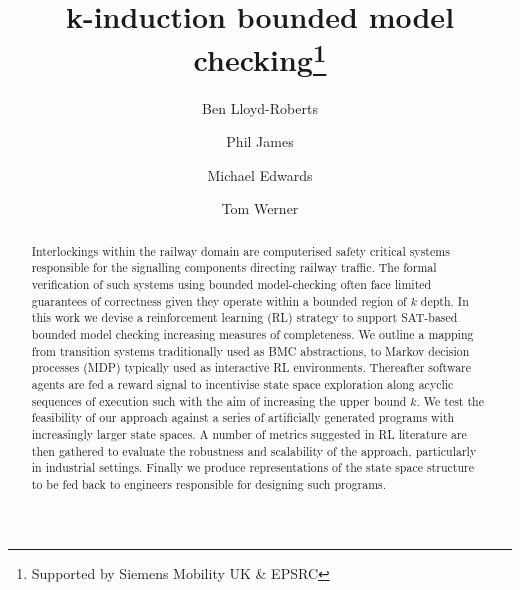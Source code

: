 \documentclass[runningheads]{llncs}
\begin{document}
%
\title{k-induction bounded model checking\thanks{Supported by Siemens Mobility UK \& EPSRC}}
%
%
\author{Ben Lloyd-Roberts \and
Phil James \and
Michael Edwards \and 
Tom Werner}
%
%


%
\maketitle              %
%
\begin{abstract}
Interlockings within the railway domain are computerised safety critical systems responsible for the signalling components directing railway traffic. The formal verification of such systems using bounded model-checking often face limited guarantees of correctness given they operate within a bounded region of $k$ depth. In this work we devise a reinforcement learning (RL) strategy to support SAT-based bounded model checking increasing measures of completeness. We outline a mapping from transition systems traditionally used as BMC abstractions, to Markov decision processes (MDP) typically used as interactive RL environments. Thereafter software agents are fed a reward signal to incentivise state space exploration along acyclic sequences of execution such with the aim of increasing the upper bound $k$. We test the feasibility of our approach against a series of artificially generated programs with increasingly larger state spaces. A number of metrics suggested in RL literature are then gathered to evaluate the robustness and scalability of the approach, particularly in industrial settings. Finally we produce representations of the state space structure to be fed back to engineers responsible for designing such programs.

\end{abstract}
\end{document}
